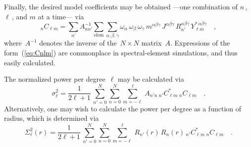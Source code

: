 Finally, the desired model coefficients may be obtained ---one combination of $n$\,, $\ell$\,, and $m$ at a time--- via
\begin{equation}
    {}_nC_{\ell m}=\sum_{n'}A^{-1}_{nn'}\sum_{\mathrm{elem}}\sum_{\alpha,\beta,\gamma}\omega_\alpha\,\omega_\beta\,\omega_\gamma\,m^{\alpha\beta\gamma}\,J^{\alpha\beta\gamma}\,R_{n'}^{\alpha\beta\gamma}\,Y_{\ell m}^{*\,\alpha\beta\gamma}
    \quad ,
    \label{eq:Cnlm}
\end{equation}
where~$A^{-1}$ denotes the inverse of the~$N\times N$ matrix~$A$.
Expressions of the form~(\ref{eq:Cnlm}) are commonplace in spectral-element simulations,
and thus easily calculated.

The normalized power per degree~$\ell$ may be calculated via
\begin{equation}
    \sigma_\ell^2=\frac{1}{2\ell+1}\,
    \sum_{n' = 0}^N\sum_{n = 0}^N\sum_{m = -\ell}^\ell\,A_{n'n}\,{}_{n'}C^*_{\ell m}\,{}_{n}C_{\ell m}
    \quad .
\end{equation}
Alternatively,
one may wish to calculate the power per degree as a function of radius,
which is determined via
\begin{equation}
    \Sigma_\ell^2(r)=\frac{1}{2\ell+1}\,
    \sum_{n' = 0}^N\sum_{n = 0}^N\sum_{m = -\ell}^\ell\,R_{n'}(r)\,R_{n}(r)\,{}_{n'}C^*_{\ell m}\,{}_{n}C_{\ell m}
    \quad .
\end{equation}

